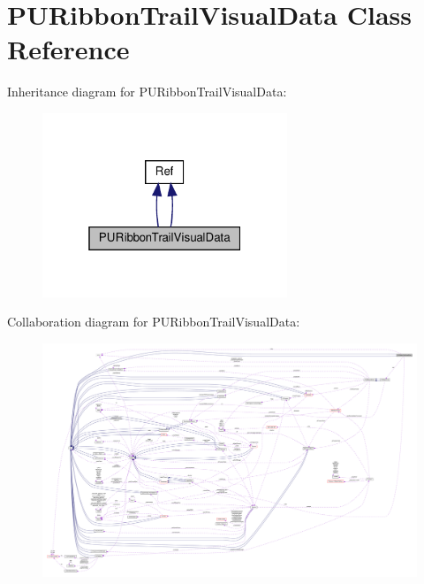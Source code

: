 \hypertarget{classPURibbonTrailVisualData}{}\section{P\+U\+Ribbon\+Trail\+Visual\+Data Class Reference}
\label{classPURibbonTrailVisualData}


Inheritance diagram for P\+U\+Ribbon\+Trail\+Visual\+Data\+:
\nopagebreak
\begin{figure}[H]
\begin{center}
\leavevmode
\includegraphics[width=208pt]{classPURibbonTrailVisualData__inherit__graph}
\end{center}
\end{figure}


Collaboration diagram for P\+U\+Ribbon\+Trail\+Visual\+Data\+:
\nopagebreak
\begin{figure}[H]
\begin{center}
\leavevmode
\includegraphics[width=350pt]{classPURibbonTrailVisualData__coll__graph}
\end{center}
\end{figure}

